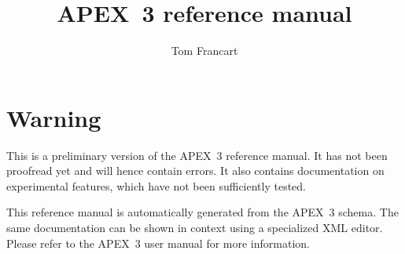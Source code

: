 \documentclass[a4paper,12pt]{article}
\title{APEX~3 reference manual}
\author{Tom Francart}
\begin{document}
\maketitle

\newpage


\section*{Warning}

This is a preliminary version of the APEX~3 reference manual. It has not been proofread
yet and will hence contain errors. It also contains documentation on experimental
features, which have not been sufficiently tested.

This reference manual is automatically generated from the APEX~3 schema. The same
documentation can be shown in context using a specialized XML editor. Please
refer to the APEX~3 user manual for more information.


\newpage

\tableofcontents



\end{document}
